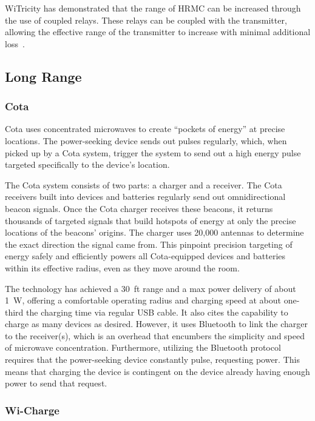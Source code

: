 WiTricity has demonstrated that the range of HRMC can be increased through the use of coupled relays. These relays can be coupled with the transmitter, allowing the effective range of the transmitter to increase with minimal additional loss~\cite{butler_tour_2013}.

\subsection{Long Range}

\subsubsection{Cota}

Cota uses concentrated microwaves to create ``pockets of energy'' at precise locations. The power-seeking device sends out pulses regularly, which, when picked up by a Cota system, trigger the system to send out a high energy pulse targeted specifically to the device’s location.

The Cota system consists of two parts: a charger and a receiver. The Cota receivers built into devices and batteries regularly send out omnidirectional beacon signals. Once the Cota charger receives these beacons, it returns thousands of targeted signals that build hotspots of energy at only the precise locations of the beacons' origins. The charger uses 20,000 antennas to determine the exact direction the signal came from. This pinpoint precision targeting of energy safely and efficiently powers all Cota-equipped devices and batteries within its effective radius, even as they move around the room.

The technology has achieved a 30~ft range and a max power delivery of about 1~W, offering a comfortable operating radius and charging speed at about one-third the charging time via regular USB cable. It also cites the capability to charge as many devices as desired. However, it uses Bluetooth to link the charger to the receiver(s), which is an overhead that encumbers the simplicity and speed of microwave concentration. Furthermore, utilizing the Bluetooth protocol requires that the power-seeking device constantly pulse, requesting power. This means that charging the device is contingent on the device already having enough power to send that request.

\subsubsection{Wi-Charge}

